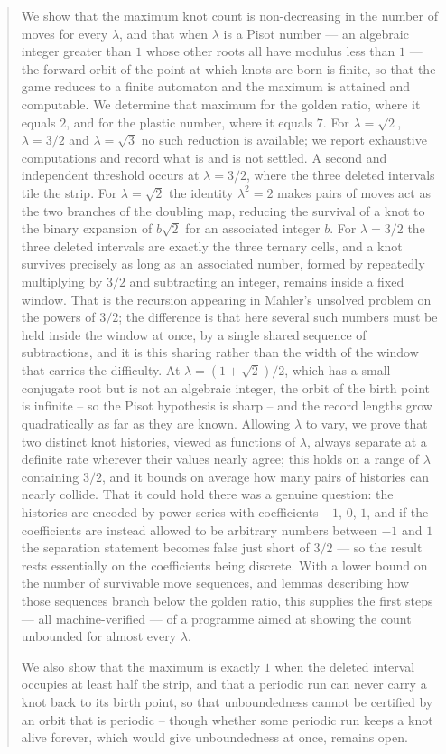 \documentclass[11pt,reqno]{amsart}
\theoremstyle{plain}
\theoremstyle{definition}
\theoremstyle{remark}
\begin{document}
\begin{abstract}
We show that the maximum knot count is non-decreasing in the number of moves
for every $\lambda$, and that when $\lambda$ is a Pisot number --- an
algebraic integer greater than $1$ whose other roots all have modulus less
than $1$ --- the forward orbit of the point at which knots are born is finite,
so that the game reduces
to a finite automaton and the maximum is attained and computable. We determine
that maximum for the golden ratio, where it equals $2$, and for the plastic
number, where it equals $7$. For $\lambda=\sqrt2$, $\lambda=3/2$ and
$\lambda=\sqrt3$ no such reduction is available; we report exhaustive
computations and record what is and is not settled. A second and independent
threshold occurs at $\lambda=3/2$, where the three deleted intervals tile the
strip. For $\lambda=\sqrt2$ the identity $\lambda^2=2$ makes pairs of moves act
as the two branches of the doubling map, reducing the survival of a knot to the
binary expansion of $b\sqrt2$ for an associated integer $b$. For $\lambda=3/2$ the three deleted intervals are exactly the three ternary
cells, and a knot survives precisely as long as an associated number, formed by
repeatedly multiplying by $3/2$ and subtracting an integer, remains inside a
fixed window. That is the recursion appearing in Mahler's unsolved problem on
the powers of $3/2$; the difference is that here several such numbers must be
held inside the window at once, by a single shared sequence of subtractions,
and it is this sharing rather than the width of the window that carries the
difficulty. At $\lambda=(1+\sqrt2)/2$, which has a small conjugate root but is not an
algebraic integer, the orbit of the birth point is infinite -- so the Pisot
hypothesis is sharp -- and the record lengths grow quadratically as far as they
are known. Allowing $\lambda$ to vary, we prove that two distinct knot histories, viewed
as functions of $\lambda$, always separate at a definite rate wherever their
values nearly agree; this holds on a range of $\lambda$ containing $3/2$, and it bounds on average
how many pairs of histories can nearly collide. That it could hold there was a
genuine question: the histories are encoded by power series with coefficients
$-1$, $0$, $1$, and if the coefficients are instead allowed to be arbitrary
numbers between $-1$ and $1$ the separation statement becomes false just short
of $3/2$ --- so the result rests essentially on the coefficients being
discrete. With a lower bound on the number of
survivable move sequences, and lemmas describing how those sequences branch
below the golden ratio, this supplies the first steps --- all machine-verified
--- of a programme aimed at showing the count unbounded for almost every
$\lambda$.
\par
We also show that the maximum is exactly $1$ when the
deleted interval occupies at least half the strip, and that a periodic run can never carry a knot back to
its birth point, so that unboundedness cannot be certified by an orbit that is
periodic -- though whether some periodic run keeps a knot alive forever, which
would give unboundedness at once, remains open.
\end{abstract}
\end{document}
